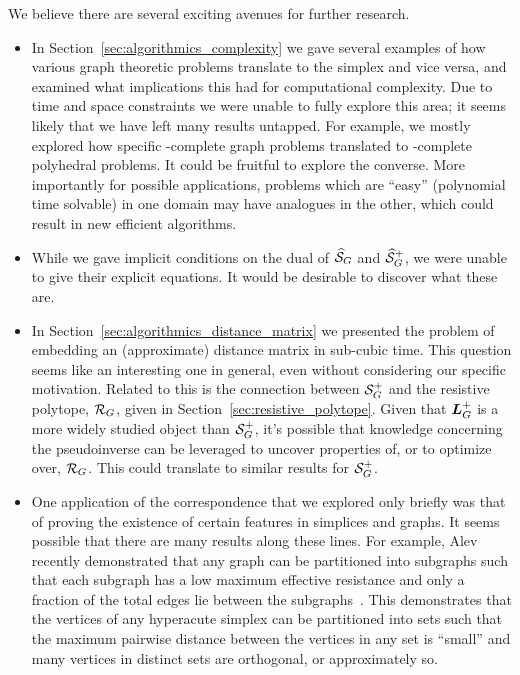 We believe there are several exciting  avenues for further  research. 
\begin{itemize}
	\item In Section~\ref{sec:algorithmics_complexity} we gave several  examples of how various graph  theoretic problems translate to the simplex and vice  versa, and examined what implications this had for computational complexity. Due to time and space constraints we were unable to fully explore this area; it seems likely that we have left many  results untapped.  For example, we mostly explored how specific \NP-complete graph problems translated to \NP-complete polyhedral problems. It could be fruitful to explore the converse. More importantly for possible applications, problems which are ``easy'' (polynomial  time solvable) in one domain may have analogues  in the other, which could result in new  efficient algorithms. 
	\item While  we gave implicit conditions on the  dual of $\widehat{\mathcal{S}}_G$ and $\widehat{\mathcal{S}}_G^+$, we were unable to give their explicit equations. It  would be desirable to discover what these are.   
	\item In Section~\ref{sec:algorithmics_distance_matrix} we presented the problem of embedding an (approximate) distance matrix  in sub-cubic time. This question  seems like an interesting one in general, even without considering our specific motivation. Related to  this is the  connection  between  $\mathcal{S}_G^+$  and the resistive polytope,  $\mathcal{R}_G$, given in Section~\ref{sec:resistive_polytope}.  Given that $\vb*{L}_G^+$ is a more widely  studied object than $\mathcal{S}_G^+$, it's possible that knowledge concerning  the  pseudoinverse can be leveraged  to uncover properties of, or to optimize over,  $\mathcal{R}_G$.  This could translate to similar results  for $\mathcal{S}_G^+$. 	
	\item One application  of  the correspondence that we explored only briefly  was that of proving the existence of  certain features in simplices and graphs.  It seems possible that there are many  results  along these lines.  For example, Alev \etal recently demonstrated that any graph  can be partitioned into subgraphs such that  each subgraph has a low maximum effective resistance  and only a fraction of the total edges lie between the subgraphs~\cite{alev2017graph}. This demonstrates that the vertices of any hyperacute simplex can be partitioned into  sets  such that the maximum pairwise distance between the vertices in any set is ``small'' and many  vertices  in distinct sets are orthogonal, or approximately so. 


\end{itemize}
